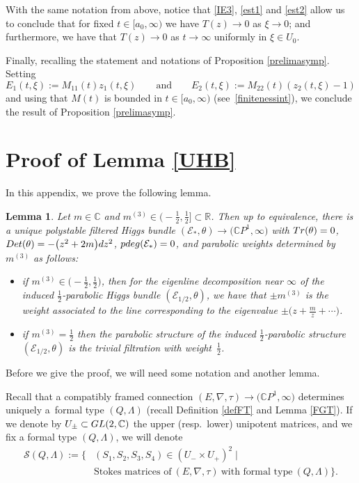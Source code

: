 \documentclass[11pt]{article}
\numberwithin{equation}{section}
\newtheorem{Lemma}[Theorem]{Lemma}
\numberwithin{equation}{section}
\newcommand{\CP}{\mathbb{C}P^1}
\begin{document}
With the same notation from above, notice that \eqref{IE3}, \eqref{est1} and \eqref{est2} allow us to conclude that for fixed $t\in [a_0,\infty)$ we have $T(z) \to 0$ as $\xi \to 0$; and furthermore, we have that $T(z) \to 0$ as $t\to \infty$ uniformly in $\xi \in U_{0}$.

Finally, recalling the statement and notations of Proposition \ref{prelimasymp}. Setting
\[
E_1(t,\xi):= M_{11}(t) z_1(t,\xi) \qquad \text{and} \qquad E_2(t,\xi):=M_{22}(t)(z_2(t,\xi)-1)
\]
 and using that $M(t)$ is bounded in $t\in [a_0,\infty)$ (see~\eqref{finitenessint}), we conclude the result of Proposition \ref{prelimasymp}.

\section{Proof of Lemma \ref{UHB}} \label{af}

In this appendix, we prove the following lemma.

\begin{Lemma}\label{mainlemma}
Let $m\in \mathbb{C}$ and $m^{(3)}\in \bigl(-\frac12,\frac12\bigr] \subset \mathbb{R}$. Then up to equivalence, there is a unique polystable filtered Higgs bundle $(\mathcal{E}_*,\theta)\to \bigl(\CP,\infty\bigr)$ with $\textnormal{Tr}(\theta)=0$, $\textnormal{Det}(\theta)=-\bigl(z^2+2m\bigr){\rm d}z^2$, $\textnormal{pdeg}(\mathcal{E}_*)=0$, and parabolic weights determined by $m^{(3)}$ as follows:
\begin{itemize}\itemsep=0pt
 \item if $m^{(3)} \in \bigl(-\frac12,\frac12\bigr)$, then for the eigenline decomposition near $\infty$ of the induced $\frac12$-parabolic Higgs bundle $(\mathcal{E}_{1/2},\theta)$, we have that $\pm m^{(3)}$ is the weight associated to the line corresponding to the eigenvalue $\pm\bigl(z+\frac{m}{z}+\cdots \bigr)$.
 \item if $m^{(3)}=\frac12$ then the parabolic structure of the induced $\frac12$-parabolic structure $(\mathcal{E}_{1/2},\theta)$ is the trivial filtration with weight~$\frac12$.
\end{itemize}
\end{Lemma}

Before we give the proof, we will need some notation and another lemma.

Recall that a compatibly framed connection $(E,\nabla,
\tau)\to \bigl(\CP,\infty\bigr)$ determines uniquely a~formal type $(Q,\Lambda)$ (recall Definition \ref{defFT} and Lemma \ref{FGT}). If we denote by $U_{\pm}\subset {\rm GL}(2,\mathbb{C})$ the upper (resp.\ lower) unipotent matrices, and we fix a formal type $(Q,\Lambda)$, we will denote
 \begin{align*}
 \mathcal{S}(Q,\Lambda):= \bigl\{&(S_1,S_2,S_3,S_4)\in (U_{-}\times U_{+})^2 \mid \\
 & \text{Stokes matrices of} \ (E,\nabla,
 \tau) \ \text{with formal type} \ (Q,\Lambda)\bigr\}.
 \end{align*}
\end{document}
